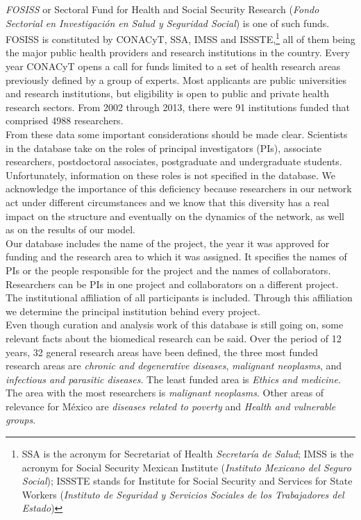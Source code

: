 \documentclass{bmcart}
\begin{document}
\emph{FOSISS} or Sectoral Fund for Health and Social Security Research
(\emph{Fondo Sectorial en Investigaci\'on en Salud y Seguridad Social}) is one of
such funds. FOSISS is constituted by CONACyT, SSA, IMSS and ISSSTE,\footnote{SSA
  is the acronym for Secretariat of Health \emph{Secretar\'ia de Salud}; IMSS is
  the acronym for Social Security Mexican Institute (\emph{Instituto Mexicano
    del Seguro Social}); ISSSTE stands for Institute for Social Security and
  Services for State Workers (\emph{Instituto de Seguridad y Servicios Sociales
    de los Trabajadores del Estado})} all of them being the major public health
providers and research institutions in the country. Every year CONACyT opens a
call for funds limited to a set of health research areas previously defined by a
group of experts. Most applicants are public universities and research
institutions, but eligibility is open to public and private health research sectors.
From 2002 through 2013, there were 91 institutions funded that
comprised 4988 researchers.\\ 

From these data some important considerations should be made
clear. Scientists in the database take on the roles of principal
investigators (PIs), associate researchers, postdoctoral associates,
postgraduate and undergraduate students.
Unfortunately, information on these roles is not specified in the database.
We acknowledge the importance of this deficiency because
researchers in our network act under different circumstances and we know
that this diversity has a real impact on the structure and eventually on the
dynamics of the network, as well as on the results of our model.\\  

Our database includes the
name of the project, the year it was approved for funding and the research area
to which it was assigned. It specifies the names of PIs or the people 
responsible for the project and the names of collaborators.
Researchers can be PIs in one project and collaborators on a different project. The institutional
affiliation of all participants is included. Through this affiliation
we determine the principal institution
behind every project.\\ 

Even though curation and analysis work of this database is still going on, some
relevant facts about the biomedical research can be said. Over the period of 12
years, 32 general research areas have been defined, the three most funded
research areas are \emph{chronic and degenerative diseases}, \emph{malignant
  neoplasms}, and \emph{infectious and parasitic diseases}. The least funded
area is \emph{Ethics and medicine}. The area with the most researchers is
\emph{malignant neoplasms}. Other areas of relevance for M\'exico are
\emph{diseases related to poverty} and \emph{Health and vulnerable groups}. \\  
\end{document}
